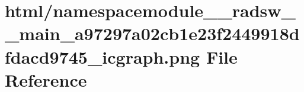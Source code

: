 \hypertarget{namespacemodule____radsw____main__a97297a02cb1e23f2449918dfdacd9745__icgraph_8png}{}\section{html/namespacemodule\+\_\+\+\_\+radsw\+\_\+\+\_\+main\+\_\+a97297a02cb1e23f2449918dfdacd9745\+\_\+icgraph.png File Reference}
\label{namespacemodule____radsw____main__a97297a02cb1e23f2449918dfdacd9745__icgraph_8png}
